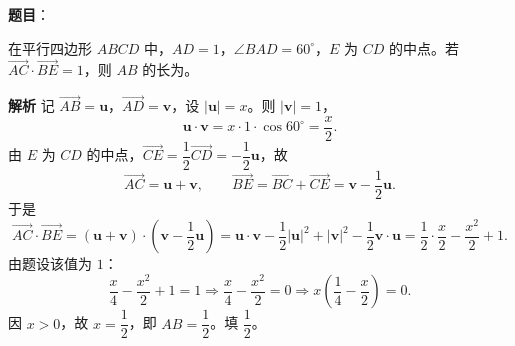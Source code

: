 \begin{answer}

\textbf{题目}：

在平行四边形 $ABCD$ 中，$AD=1$，$\angle BAD=60^\circ$，$E$ 为 $CD$ 的中点。若 $\overrightarrow{AC}\cdot\overrightarrow{BE}=1$，则 $AB$ 的长为\gkblank{}。

\textbf{解析}
记 $\overrightarrow{AB}=\mathbf u$，$\overrightarrow{AD}=\mathbf v$，设 $|\mathbf u|=x$。则 $|\mathbf v|=1$，
\nopagebreak[4]
\[\mathbf u\cdot\mathbf v=x\cdot1\cdot\cos60^\circ=\frac x2.\]
由 $E$ 为 $CD$ 的中点，$\overrightarrow{CE}=\dfrac12\overrightarrow{CD}=-\dfrac12\mathbf u$，故
\nopagebreak[4]
\[\overrightarrow{AC}=\mathbf u+\mathbf v,\qquad \overrightarrow{BE}=\overrightarrow{BC}+\overrightarrow{CE}=\mathbf v-\frac12\mathbf u.\]
于是
\nopagebreak[4]
\[\overrightarrow{AC}\cdot\overrightarrow{BE}=(\mathbf u+\mathbf v)\cdot\left(\mathbf v-\frac12\mathbf u\right)
=\mathbf u\cdot\mathbf v-\frac12|\mathbf u|^2+|\mathbf v|^2-\frac12\mathbf v\cdot\mathbf u
=\frac12\cdot\frac x2-\frac{x^2}2+1.\]
由题设该值为 $1$：
\nopagebreak[4]
\[\frac x4-\frac{x^2}2+1=1\Longrightarrow\frac x4-\frac{x^2}2=0\Longrightarrow x\left(\frac14-\frac x2\right)=0.\]
因 $x>0$，故 $x=\dfrac12$，即 $AB=\dfrac12$。填 $\dfrac12$。


\end{answer}
